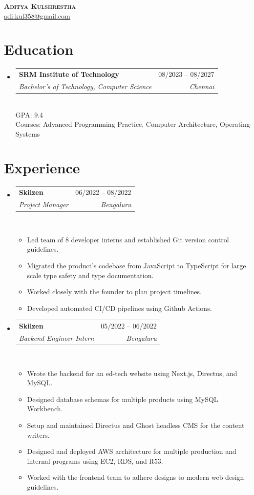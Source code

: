 \documentclass[letterpaper,11pt]{article}
\makeatletter
\newcommand{\resumeItem}[1]{%
\item\small{#1\vspace{-2pt}}%
}
\newcommand{\resumeSubheading}[4]{%
\vspace{-2pt}\item
\begin{tabular*}{0.97\textwidth}[t]{l@{\extracolsep{\fill}}r}
\textbf{#1} & #3 \\
\textit{\small #2} & \textit{\small #4} \\
\end{tabular*}
}
\newcommand{\resumeSubHeadingListStart}{\begin{itemize}[leftmargin=0.15in, label={}]}
\newcommand{\resumeSubHeadingListEnd}{\end{itemize}}
\newcommand{\resumeItemListStart}{\vspace{-5pt}\begin{itemize}}
\newcommand{\resumeItemListEnd}{\end{itemize}\vspace{-5pt}}
\makeatother
\begin{document}
{\centering
\textbf{\Huge \scshape Aditya Kulshrestha} \\ \vspace{1pt}
\small
\href{mailto:adi.kul358@gmail.com}{\underline{adi.kul358@gmail.com}}



}

\section{Education}
\resumeSubHeadingListStart
    \resumeSubheading
    {SRM Institute of Technology}
    {Bachelor's of Technology, Computer Science}
    {08/2023 -- 08/2027}
    {Chennai}\\
    {\small GPA: 9.4\\Courses: Advanced Programming Practice, Computer Architecture, Operating Systems}
\resumeSubHeadingListEnd

\section{Experience}
\resumeSubHeadingListStart
    \resumeSubheading
    {Skilzen}
    {Project Manager}
    {06/2022 -- 08/2022}
    {Bengaluru}\\
        \resumeItemListStart
            \resumeItem{Led team of 8 developer interns and established Git version control guidelines.}
            \resumeItem{Migrated the product’s codebase from JavaScript to TypeScript for large scale type safety and type documentation.}
            \resumeItem{Worked closely with the founder to plan project timelines.}
            \resumeItem{Developed automated CI/CD pipelines using Github Actions.}
        \resumeItemListEnd
    \resumeSubheading
    {Skilzen}
    {Backend Engineer Intern}
    {05/2022 -- 06/2022}
    {Bengaluru}\\
        \resumeItemListStart
            \resumeItem{Wrote the backend for an ed-tech website using Next.js, Directus, and MySQL.}
            \resumeItem{Designed database schemas for multiple products using MySQL Workbench.}
            \resumeItem{Setup and maintained Directus and Ghost headless CMS for the content writers.}
            \resumeItem{Designed and deployed AWS architecture for multiple production and internal programs using EC2, RDS, and R53.}
            \resumeItem{Worked with the frontend team to adhere designs to modern web design guidelines.}
        \resumeItemListEnd
\resumeSubHeadingListEnd

\end{document}
